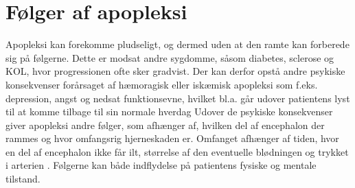 \section{Følger af apopleksi }
Apopleksi kan forekomme pludseligt, og dermed uden at den ramte kan forberede sig på følgerne. Dette er modsat andre sygdomme, såsom diabetes, sclerose og KOL, hvor progressionen ofte sker gradvist. Der kan derfor opstå andre psykiske konsekvenser forårsaget af hæmoragisk eller iskæmisk apopleksi som f.eks. depression, angst og nedsat funktionsevne, hvilket bl.a. går udover patientens lyst til at komme tilbage til sin normale hverdag \cite{Muus2008} Udover de psykiske konsekvenser giver apopleksi andre følger, som afhænger af, hvilken del af encephalon der rammes og hvor omfangsrig hjerneskaden er. Omfanget afhænger af tiden, hvor en del af encephalon ikke får ilt, størrelse af den eventuelle blødningen og trykket i arterien \cite{Michael-Titus2010}. Følgerne kan både indflydelse på patientens fysiske og mentale tilstand. \\


